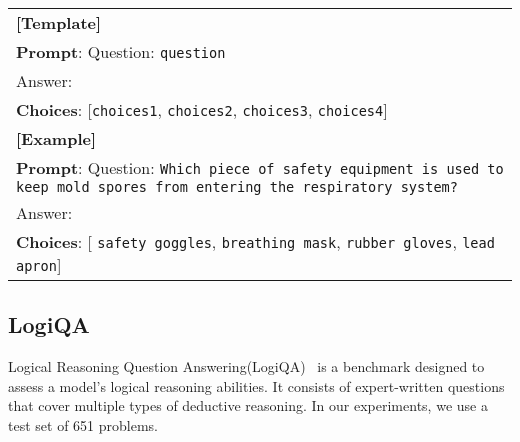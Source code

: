 \begin{table}[H]
\centering
\begin{small}
\begin{tabular}{|p{7cm}|}  %
\hline
\textbf{[Template]} \\
\textbf{Prompt}: Question: \texttt{question}\\Answer: \\
\textbf{Choices}: [\texttt{choices1}, \texttt{choices2}, \texttt{choices3}, \texttt{choices4}] \\ 
\hline \textbf{[Example]} \\
\textbf{Prompt}: Question: \texttt{Which piece of safety equipment is used to keep mold spores from entering the respiratory system?} \\Answer: \\
\textbf{Choices}: [ \texttt{safety goggles}, \texttt{breathing mask}, \texttt{rubber gloves}, \texttt{lead apron}] \\ \hline
\end{tabular}
\end{small}
\end{table}

\subsection{LogiQA}

Logical Reasoning Question Answering(LogiQA)~\cite{liu2021logiqa} is a benchmark designed to assess a model's logical reasoning abilities. It consists of expert-written questions that cover multiple types of deductive reasoning. In our experiments, we use a test set of 651 problems.

